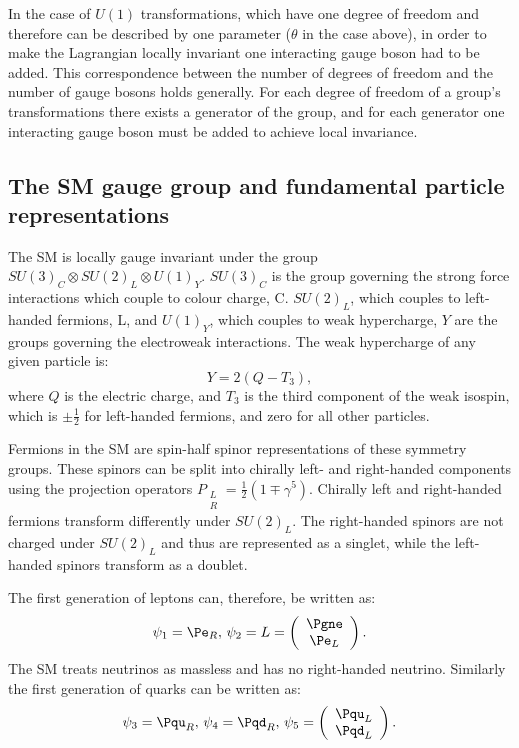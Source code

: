 In the case of $U(1)$ transformations, which have one degree of freedom and therefore can be described by one parameter ($\theta$ in the case above), in order to make the Lagrangian locally invariant one interacting gauge boson had to be added. This correspondence between the number of degrees of freedom and the number of gauge bosons holds generally. For each degree of freedom of a group's transformations there exists a generator of the group, and for each generator one interacting gauge boson must be added to achieve local invariance.

\subsection{The SM gauge group and fundamental particle representations}
\label{sec:smgauge}
The \ac{SM} is locally gauge invariant under the group $SU\!\left(3\right)_{C}\otimes SU\!\left(2\right)_{L}\otimes U\!\left(1\right)_{Y}$. $SU\!\left(3\right)_{C}$ is the group governing the strong force interactions which couple to colour charge, C. $SU\!\left(2\right)_{L}$, which couples to left-handed fermions, L, and $U\!\left(1\right)_{Y}$, which couples to weak hypercharge, $Y$ are the groups governing the electroweak interactions. The weak hypercharge of any given particle is:
\begin{equation}
  Y=2(Q-T_{3}),
\end{equation}
where $Q$ is the electric charge, and $T_{3}$ is the third component of the weak isospin, which is $\pm\frac{1}{2}$ for left-handed fermions, and zero for all other particles.

 Fermions in the SM are spin-half spinor representations of these symmetry groups. These spinors can be split into chirally left- and right-handed components using the projection operators $P_{\substack{L \\R}}=\frac{1}{2}(1\mp \gamma^{5})$. Chirally left and right-handed fermions transform differently under $SU\!\left(2\right)_{L}$. The right-handed spinors are not charged under $SU\!\left(2\right)_{L}$ and thus are represented as a singlet, while the left-handed spinors transform as a doublet.

The first generation of leptons can, therefore, be written as:
\begin{equation}
  \psi_{1}=\Pe_{R},\,\psi_{2}=L=\left(\begin{array}{c} \Pgne \\ \Pe_{L}\end{array}\right).
\end{equation}
The SM treats neutrinos as massless and has no right-handed neutrino. Similarly the first generation of quarks can be written as:
\begin{equation}
  \psi_{3}=\Pqu_{R},\,\psi_{4}=\Pqd_{R},\,\psi_{5}=\left(\begin{array}{c} \Pqu_{L} \\ \Pqd_{L}\end{array}\right).
\end{equation}

